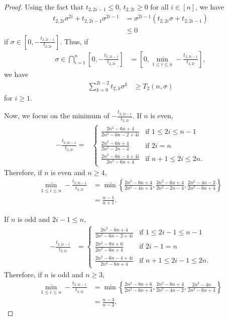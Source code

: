 \documentclass{article}
\theoremstyle{plain}
\theoremstyle{definition}
\theoremstyle{remark}
\def\bigset#1{\left\{#1\right\}}
\def\bigclosed#1{\left[#1\right]}
\begin{document}
\begin{proof}
Using the fact that $t_{2,2i-1}\le 0$, $t_{2,2i}\ge 0$ for all $i\in [n]$, we have 
\begin{align*}
    t_{2,2i}\sigma^{2i} + t_{2,2i-1}\sigma^{2i-1} &= \sigma^{2i-1}(t_{2,2i}\sigma + t_{2,2i-1}) \\
    &\le 0
\end{align*}
if $\sigma\in \bigclosed{0, -\frac{t_{2,2i-1}}{t_{2,2i}}}$. Thus, if 
\begin{align*}
    \sigma \in \bigcap_{i=1}^n \bigclosed{0, -\frac{t_{2,2i-1}}{t_{2,2i}}} &= \bigclosed{0, \min_{1\le i\le n} -\frac{t_{2,2i-1}}{t_{2,2i}}},
\end{align*}
we have 
\begin{align*}
    \sum_{k=0}^{2i-2} t_{2,k}\sigma^k &\ge T_2(n, \sigma)
\end{align*}
for $i\ge 1$.

Now, we focus on the minimum of $-\frac{t_{2,2i-1}}{t_{2,2i}}$. If $n$ is even, \begin{align*}
    -\frac{t_{2,2i-1}}{t_{2,2i}} = & 
    \begin{cases}
        \frac{2n^2-6n+4}{2n^2-6n-2+4i}& \text{if } 1\le 2i\le n-1 \\
        \frac{2n^2-6n+4}{2n^2-2n-4}& \text{if } 2i = n \\
        \frac{2n^2-6n-4+4i}{2n^2-6n+4}& \text{if } n+1 \le 2i \le 2n.
    \end{cases}
\end{align*}
Therefore, if $n$ is even and $n\ge 4$, 
\begin{align*}
    \min_{1\le i \le n} -\frac{t_{2,2i-1}}{t_{2,2i}} &= \min \bigset{ \frac{2n^2-6n+4}{2n^2-4n+4}, \frac{2n^2-6n+4}{2n^2-2n-4}, \frac{2n^2-4n-2}{2n^2-6n+4} }\\
    &= \frac{n-1}{n+1}.
\end{align*}

If $n$ is odd and $2i-1\le n$, 
\begin{align*}
    -\frac{t_{2,2i-1}}{t_{2,2i}} &= 
    \begin{cases}
        \frac{2n^2-6n+4}{2n^2-6n-2+4i}& \text{if } 1 \le 2i-1 \le n-1 \\
        \frac{2n^2-8n+6}{2n^2-6n+4}& \text{if } 2i-1 = n \\
        \frac{2n^2-6n-4+4i}{2n^2-6n+4}& \text{if } n+1 \le 2i - 1 \le 2n.
    \end{cases}
\end{align*}
Therefore, if $n$ is odd and $n\ge 3$,
\begin{align*}
    \min_{1\le i \le n} -\frac{t_{2,2i-1}}{t_{2,2i}} &= \min \bigset{ \frac{2n^2-8n+6}{2n^2-6n+4} , \frac{2n^2-6n+4}{2n^2-4n-2}, \frac{2n^2-4n}{2n^2-6n+4} }\\
    &= \frac{n-3}{n-2}.
\end{align*}


\end{proof}
\end{document}
